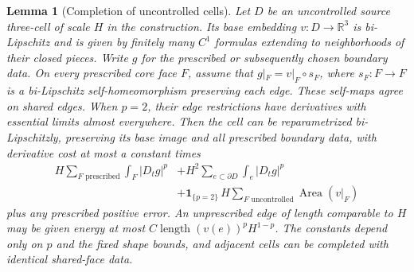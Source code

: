 \documentclass[11pt]{article}
\numberwithin{equation}{section}
\newtheorem{lemma}[theorem]{Lemma}
\theoremstyle{definition}
\theoremstyle{remark}
\begin{document}
\begin{lemma}[Completion of uncontrolled cells]\label{la:cell-completion}
Let $D$ be an uncontrolled source three-cell of scale $H$ in the
construction.  Its base embedding $v:D\to\mathbb R^3$ is bi-Lipschitz and is
given by finitely many $C^1$ formulas extending to neighborhoods of
their closed pieces.  Write $g$ for the prescribed or subsequently
chosen boundary data.  On every prescribed core face $F$,
assume that $g|_F=v|_F\circ s_F$, where $s_F:F\to F$ is a
bi-Lipschitz self-homeomorphism preserving each edge.  These self-maps
agree on shared edges.  When $p=2$, their edge restrictions have
derivatives with essential limits almost everywhere.
Then the cell can be reparametrized bi-Lipschitzly, preserving its
base image and all prescribed boundary data, with derivative cost
at most a constant times
\begin{equation}\label{la:cell-cost}
 \begin{split}
 H\sum_{F\text{ prescribed}}\int_F|D_tg|^p
 &+H^2\sum_{e\subset\partial D}\int_e|D_tg|^p\\
 &+\mathbf1_{\{p=2\}}\,
       H\sum_{F\text{ uncontrolled}}\operatorname{Area}(v|_F)
 \end{split}
\end{equation}
plus any prescribed positive error.  An unprescribed edge of length
comparable to $H$ may be given energy at most
$C\operatorname{length}(v(e))^pH^{1-p}$.
The constants depend only on $p$ and the fixed shape bounds, and
adjacent cells can be completed with identical shared-face data.
\end{lemma}
\end{document}
